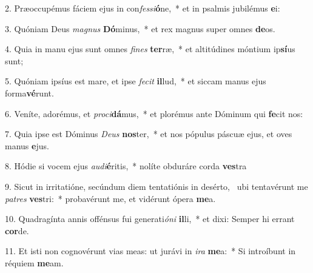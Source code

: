 2. Præoccupémus fáciem ejus in con\textit{fes}\textit{si}\textbf{ó}ne,~*  et in psalmis jubilémus \textbf{e}i:\

3. Quóniam Deus \textit{ma}\textit{gnus} \textbf{Dó}minus,~*  et rex magnus super omnes \textbf{de}os.\

4. Quia in manu ejus sunt omnes \textit{fi}\textit{nes} \textbf{ter}ræ,~*  et altitúdines móntium ip\textbf{sí}us sunt;\

5. Quóniam ipsíus est mare, et ipse \textit{fe}\textit{cit} \textbf{il}lud,~*  et siccam manus ejus forma\textbf{vé}runt.\

6. Veníte, adorémus, et \textit{pro}\textit{ci}\textbf{dá}mus,~*  et plorémus ante Dóminum qui \textbf{fe}cit nos:\

7. Quia ipse est Dóminus \textit{De}\textit{us} \textbf{nos}ter,~*  et nos pópulus páscuæ ejus, et oves manus \textbf{e}jus.\

8. Hódie si vocem ejus \textit{au}\textit{di}\textbf{é}ritis,~*  nolíte obduráre corda \textbf{ves}tra\

9. Sicut in irritatióne, secúndum diem tentatiónis in desérto, \dag\  ubi tentavérunt me \textit{pa}\textit{tres} \textbf{ves}tri:~*  probavérunt me, et vidérunt ópera \textbf{me}a.\

10. Quadragínta annis offénsus fui generati\textit{ó}\textit{ni} \textbf{il}li,~*  et dixi: Semper hi errant \textbf{cor}de.\

11. Et isti non cognovérunt vias meas: ut jurávi in \textit{i}\textit{ra} \textbf{me}a:~*  Si introíbunt in réquiem \textbf{me}am.\

